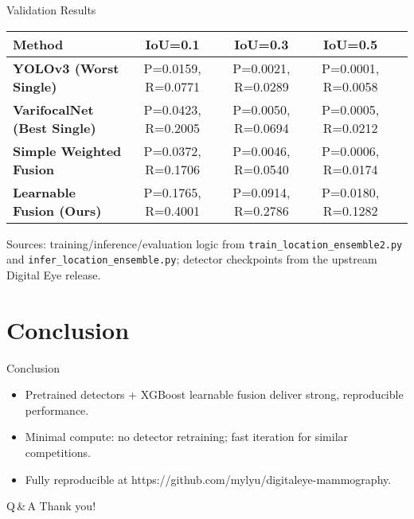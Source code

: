 \documentclass[aspectratio=169]{beamer}
\begin{document}
\begin{frame}{Validation Results}
  \begin{table}[t]
    \centering
    \small
    \begin{tabular}{lcccc}
      \toprule
      Method & IoU=0.1 & IoU=0.3 & IoU=0.5 \\
      \midrule
      \textbf{YOLOv3 (Worst Single)} & P=0.0159, R=0.0771 & P=0.0021, R=0.0289 & P=0.0001, R=0.0058 \\
      \midrule
      \textbf{VarifocalNet (Best Single)} & P=0.0423, R=0.2005 & P=0.0050, R=0.0694 & P=0.0005, R=0.0212 \\
      \midrule
      \textbf{Simple Weighted Fusion} & P=0.0372, R=0.1706 & P=0.0046, R=0.0540 & P=0.0006, R=0.0174 \\
      \midrule
      \textbf{Learnable Fusion (Ours)} & P=0.1765, R=0.4001 & P=0.0914, R=0.2786 & P=0.0180, R=0.1282 \\
      \bottomrule
    \end{tabular}
  \end{table}
  \vspace{2pt}
  \scriptsize Sources: training/inference/evaluation logic from \texttt{train\_location\_ensemble2.py} and \texttt{infer\_location\_ensemble.py}; detector checkpoints from the upstream Digital Eye release.
\end{frame}

\section{Conclusion}

\begin{frame}{Conclusion}
  \begin{itemize}
    \item \alert{Pretrained detectors} + \alert{XGBoost learnable fusion} deliver strong, reproducible performance.
    \item Minimal compute: no detector retraining; fast iteration for similar competitions.
    \item Fully reproducible at \alert{https://github.com/mylyu/digitaleye-mammography}.
  \end{itemize}
\end{frame}

\begin{frame}{Q\,\&\,A}
  \centering\Large Thank you!
\end{frame}
\end{document}
